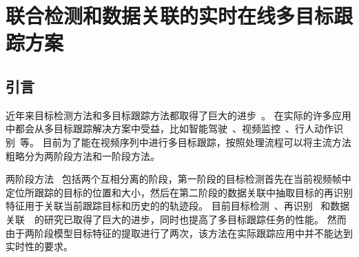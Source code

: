 
\chapter{联合检测和数据关联的实时在线多目标跟踪方案}
\label{chap:jdan}

\section{引言}

近年来目标检测方法和多目标跟踪方法都取得了巨大的进步~\cite{RN1002,RN1215,mahmoudi2019multi}。
在实际的许多应用中都会从多目标跟踪解决方案中受益，比如智能驾驶~\cite{auto_driving}、视频监控~\cite{deep_sort}、行人动作识别~\cite{mot16}等。
目前为了能在视频序列中进行多目标跟踪，按照处理流程可以将主流方法粗略分为两阶段方法和一阶段方法。



两阶段方法~\cite{fang2018recurrent,nonlocal_association,poi} 包括两个互相分离的阶段，第一阶段的目标检测首先在当前视频帧中定位所跟踪的目标的位置和大小，然后在第二阶段的数据关联中抽取目标的再识别特征用于关联当前跟踪目标和历史的的轨迹段。
目前目标检测~\cite{faster,point,redmon2018yolov3}、再识别~\cite{k_reciprocal,expanded_re} 和数据关联~\cite{nonlocal_association}~的研究已取得了巨大的进步，同时也提高了多目标跟踪任务的性能。
然而由于两阶段模型目标特征的提取进行了两次，该方法在实际跟踪应用中并不能达到实时性的要求。

